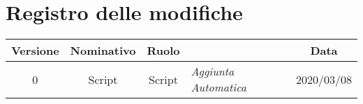 \section*{Registro delle modifiche}
\renewcommand{\arraystretch}{1.8}

    \begin{longtable}{|c|c|c|p{3.8cm}|c|}
        \hline
        \rowcolor{header}
        \textbf{Versione} & \textbf{Nominativo} & \textbf{Ruolo} & \centering{\textbf{Descrizione}} & \textbf{Data} \\ 
        \hline 
        0 & Script & Script & \small{\textit{ Aggiunta Automatica }} & 2020/03/08 \\ 
        \hline
    \end{longtable}